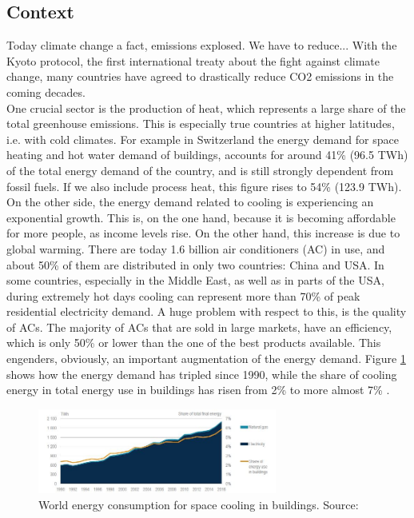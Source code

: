 \documentclass{article}
\begin{document}
\subsection{Context}
Today climate change a fact, emissions explosed. We have to reduce...
With the Kyoto protocol, the first international treaty about the fight against climate change, many countries have agreed to drastically reduce CO2 emissions in the coming decades.\\
One crucial sector is the production of heat, which represents a large share of the total greenhouse emissions. This is especially true countries at higher latitudes, i.e. with cold climates. For example in Switzerland the energy demand for space heating and hot water demand of buildings, accounts for around 41\% (96.5 TWh) of the total energy demand of the country, and is still strongly dependent from fossil fuels. If we also include process heat, this figure rises to 54\% (123.9 TWh)\cite{bacherEnergieRespektSchlusselFur2014}. \\
On the other side, the energy demand related to cooling is experiencing an exponential growth. This is, on the one hand, because it is becoming affordable for more people, as income levels rise. On the other hand, this increase is due to global warming. 
There are today 1.6 billion air conditioners (AC) in use, and about 50\% of them are distributed in only two countries: China and USA. In some countries, especially in the Middle East, as well as in parts of the USA, during extremely hot days cooling can represent more than 70\% of peak residential electricity demand. A huge problem with respect to this, is the quality of ACs. The majority of ACs that are sold in large markets, have an efficiency, which is only 50\% or lower than the one of the best products available. This engenders, obviously, an important augmentation of the energy demand. Figure \ref{fig:cooling_energy} shows how the energy demand has tripled since 1990, while the share of cooling energy in total energy use in buildings has risen from 2\% to more almost 7\% \cite{birolFutureCooling2018}. \\ 

\begin{figure}[h!]
	\centering
	\includegraphics[width=0.7\textwidth]{cooling_energy.JPG}
	\caption{World energy consumption for space cooling in buildings. Source:\cite{birolFutureCooling2018}}
	\label{fig:cooling_energy}
\end{figure}
\end{document}
